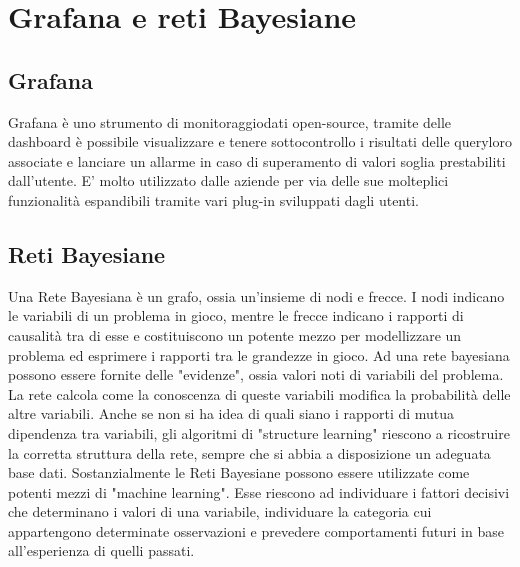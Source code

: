 \section{Grafana e reti Bayesiane}
		\subsection{Grafana}			
Grafana è uno strumento di monitoraggio\pedice dati open-source, tramite delle dashboard è possibile visualizzare e tenere sottocontrollo i risultati delle query\pedice loro associate e lanciare un allarme in caso di superamento di valori soglia prestabiliti dall'utente. E' molto utilizzato dalle aziende per via delle sue molteplici funzionalità  espandibili tramite vari plug-in sviluppati dagli utenti.


		\subsection{Reti Bayesiane}
Una Rete Bayesiana è un grafo, ossia un'insieme di nodi e frecce. I nodi
indicano le variabili di un problema in gioco, mentre le frecce indicano i
rapporti di causalità tra di esse e costituiscono un potente mezzo per
modellizzare un problema ed esprimere i rapporti tra le grandezze in gioco.
Ad una rete bayesiana possono essere fornite delle "evidenze", ossia valori noti di variabili del problema. 
La rete calcola come la conoscenza di queste variabili modifica la probabilità  delle altre variabili.
Anche se non si ha idea di quali siano i rapporti di mutua dipendenza tra
variabili, gli algoritmi di "structure learning" riescono a ricostruire la corretta struttura della rete, sempre che si abbia a disposizione un adeguata base dati.
Sostanzialmente le Reti Bayesiane possono essere utilizzate come potenti mezzi
di "machine learning\pedice". Esse riescono ad individuare i fattori decisivi che
determinano i valori di una variabile, individuare la categoria cui appartengono determinate osservazioni e prevedere comportamenti futuri in base all'esperienza di quelli passati.


\newpage
